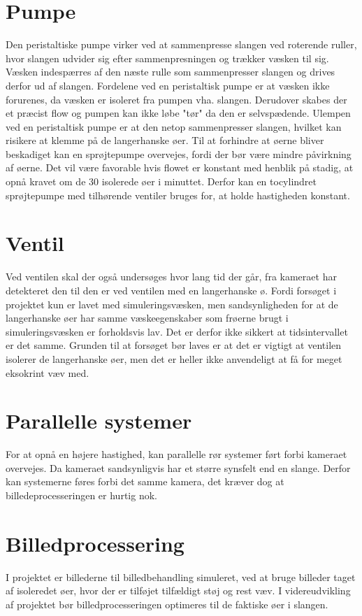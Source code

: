 \section{Pumpe}
Den peristaltiske pumpe virker ved at sammenpresse slangen ved roterende ruller, hvor slangen udvider sig efter sammenpresningen og trækker væsken til sig. Væsken indespærres af den næste rulle som sammenpresser slangen og drives derfor ud af slangen. Fordelene ved en peristaltisk pumpe er at væsken ikke forurenes, da væsken er isoleret fra pumpen vha. slangen. Derudover skabes der et præcist flow og pumpen kan ikke løbe "tør" da den er selvspædende. Ulempen ved en peristaltisk pumpe er at den netop sammenpresser slangen, hvilket kan risikere at klemme på de langerhanske øer. Til at forhindre at øerne bliver beskadiget kan en sprøjtepumpe overvejes, fordi der bør være mindre påvirkning af øerne. Det vil være favorable hvis flowet er konstant med henblik på stadig, at opnå kravet om de 30 isolerede øer i minuttet. Derfor kan en tocylindret sprøjtepumpe med tilhørende ventiler bruges for, at holde hastigheden konstant. 

\section{Ventil}
Ved ventilen skal der også undersøges hvor lang tid der går, fra kameraet har detekteret den til den er ved ventilen med en langerhanske ø. Fordi forsøget i projektet kun er lavet med simuleringsvæsken, men sandsynligheden for at de langerhanske øer har samme væskeegenskaber som frøerne brugt i simuleringsvæsken er forholdsvis lav. Det er derfor ikke sikkert at tidsintervallet er det samme. Grunden til at forsøget bør laves er at det er vigtigt at ventilen isolerer de langerhanske øer, men det er heller ikke anvendeligt at få for meget eksokrint væv med.

\section{Parallelle systemer}
For at opnå en højere hastighed, kan parallelle rør systemer ført forbi kameraet overvejes.
Da kameraet sandsynligvis har et større synsfelt end en slange. Derfor kan systemerne føres forbi det samme kamera, det kræver dog at billedeprocesseringen er hurtig nok.

\section{Billedprocessering}
I projektet er billederne til billedbehandling simuleret, ved at bruge billeder taget af isoleredet øer, hvor der er tilføjet tilfældigt støj og rest væv. I videreudvikling af projektet bør billedprocesseringen optimeres til de faktiske øer i slangen.


